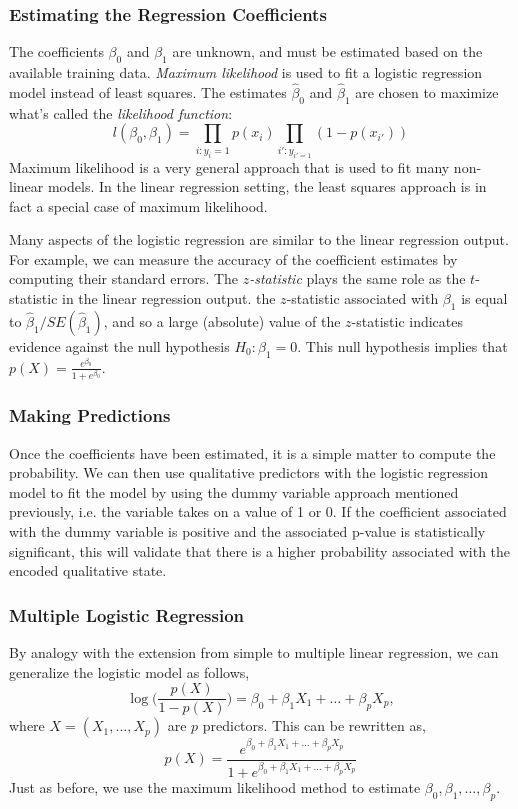 \documentclass{article}
\numberwithin{equation}{section}
\begin{document}
\begin{enumerate}
\subsubsection{Estimating the Regression Coefficients}
The coefficients $\beta_0$ and $\beta_1$  are unknown, and must be estimated based on the available training data. \textit{Maximum likelihood} is used to fit a logistic regression model instead of least squares. The estimates $\hat \beta_0$ and $\hat\beta_1$ are chosen to maximize what's called the \textit{likelihood function}:
\begin{equation}
    l(\beta_0,\beta_1) = \prod_{i:y_i = 1} p(x_i) \prod_{i':y_{i' = 1}} (1-p(x_{i'}))  
\end{equation}
Maximum likelihood is a very general approach that is used to fit many non-linear models. In the linear regression setting, the least squares approach is in fact a special case of maximum likelihood.

Many aspects of the logistic regression are similar to the linear regression output. For example, we can measure the accuracy of the coefficient estimates by computing their standard errors. The \textit{ $z$-statistic} plays the same role as the $t$-statistic in the linear regression output. the $z$-statistic associated with $\beta_1$ is equal to $\hat \beta_1/SE(\hat\beta_1)$, and so a large (absolute) value of the $z$-statistic indicates evidence against the null hypothesis $H_0 : \beta_1 = 0$. This null hypothesis implies that $p(X) = \frac{e^{\beta_0}}{1+e^{\beta_0}}$.

\subsubsection{Making Predictions}
Once the coefficients have been estimated, it is a simple matter to compute
the probability. We can then use qualitative predictors with the logistic regression model to fit the model by using the dummy variable approach mentioned previously, i.e. the variable takes on a value of 1 or 0. If the coefficient associated with the dummy variable is positive and the associated p-value is statistically significant, this will validate that there is a higher probability associated with the encoded qualitative state.

\subsubsection{Multiple Logistic Regression}
By analogy with the extension from simple to multiple linear
regression, we can generalize the logistic model as follows,
\begin{equation}
    \log \Bigg ( \frac{p(X)}{1-p(X)} \Bigg ) = \beta_0+\beta_1 X_1 + \dots + \beta_pX_p,
\end{equation}
where $X = (X_1,...,X_p)$ are $p$ predictors. This can be rewritten as,
\begin{equation}
    p(X) = \frac{e^{\beta_0+\beta_1 X_1 + \dots + \beta_pX_p}}{1+e^{\beta_0+\beta_1 X_1 + \dots + \beta_pX_p}}
\end{equation}
Just as before, we use the maximum likelihood method to estimate $\beta_0, \beta_1,\dots,\beta_p$.


\end{enumerate}
\end{document}
